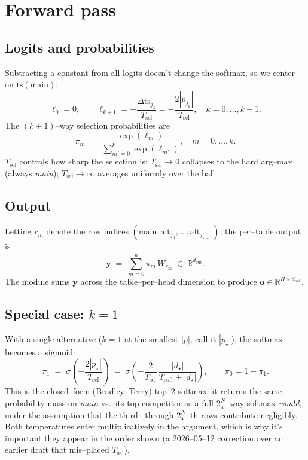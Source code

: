 \documentclass[11pt]{article}
\newcommand{\NAP}{N_{\!\text{a}}}
\newcommand{\nalt}{k}
\newcommand{\bts}{\mathrm{ts}}
\newcommand{\Tsoft}{T_{\!\text{soft}}}
\newcommand{\Tsel}{T_{\!\text{sel}}}
\begin{document}
\section{Forward pass}

\subsection{Logits and probabilities}

Subtracting a constant from all logits doesn't change the softmax, so we
center on $\bts(\text{main})$:
\begin{equation}
  \ell_0 = 0, \qquad
  \ell_{k+1} = -\frac{\Delta \bts_{j_k}}{\Tsel} = -\frac{2|p_{j_k}|}{\Tsel},
  \quad k = 0, \dots, \nalt{-}1.
\end{equation}
The $(\nalt+1)$--way selection probabilities are
\begin{equation}
  \pi_m \;=\; \frac{\exp(\ell_m)}{\sum_{m'=0}^{\nalt} \exp(\ell_{m'})},
  \quad m = 0, \dots, \nalt.
\end{equation}
$\Tsel$ controls how sharp the selection is: $\Tsel \to 0$ collapses to the
hard arg--max (always \emph{main}); $\Tsel \to \infty$ averages uniformly over
the ball.

\subsection{Output}

Letting $r_m$ denote the row indices $(\text{main}, \text{alt}_{j_0}, \ldots,
\text{alt}_{j_{\nalt-1}})$, the per--table output is
\begin{equation}
  \bm{y} \;=\; \sum_{m=0}^{\nalt} \pi_m \, W_{r_m} \;\in\; \mathbb{R}^{d_{\text{out}}}.
\end{equation}
The module sums $\bm{y}$ across the table--per--head dimension to produce
$\bm{o} \in \mathbb{R}^{H \times d_{\text{out}}}$.

\subsection{Special case: $\nalt = 1$}

With a single alternative ($\nalt = 1$ at the smallest $|p|$, call it
$|p_\star|$), the softmax becomes a sigmoid:
\begin{equation}
  \pi_1 \;=\; \sigma\!\left(-\frac{2 |p_\star|}{\Tsel}\right) \;=\;
  \sigma\!\left(-\frac{2}{\Tsel}\,\frac{|d_\star|}{\Tsoft + |d_\star|}\right),
  \qquad \pi_0 = 1 - \pi_1.
\end{equation}
This is the closed--form (Bradley--Terry) top--2 softmax: it returns the same
probability mass on \emph{main} vs.\ its top competitor as a full
$2^\NAP$--way softmax \emph{would}, under the assumption that the third--
through $2^\NAP$--th rows contribute negligibly. Both temperatures enter
multiplicatively in the argument, which is why it's important they appear
in the order shown (a 2026--05--12 correction over an earlier draft that
mis--placed $\Tsel$).
\end{document}
